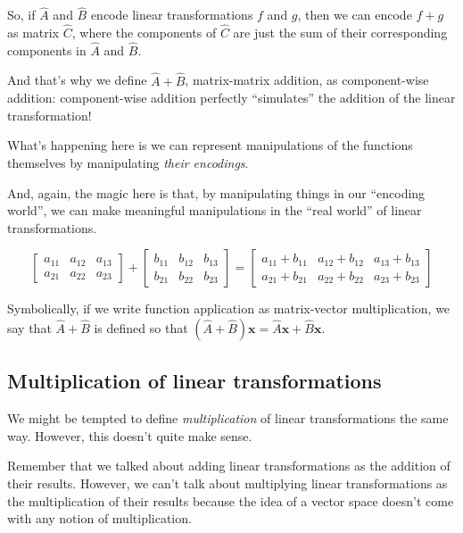\documentclass[]{article}
\begin{document}
So, if \(\hat{A}\) and \(\hat{B}\) encode linear transformations \(f\) and
\(g\), then we can encode \(f + g\) as matrix \(\hat{C}\), where the components
of \(\hat{C}\) are just the sum of their corresponding components in \(\hat{A}\)
and \(\hat{B}\).

And that's why we define \(\hat{A} + \hat{B}\), matrix-matrix addition, as
component-wise addition: component-wise addition perfectly ``simulates'' the
addition of the linear transformation!

What's happening here is we can represent manipulations of the functions
themselves by manipulating \emph{their encodings}.

And, again, the magic here is that, by manipulating things in our ``encoding
world'', we can make meaningful manipulations in the ``real world'' of linear
transformations.

\[
\begin{bmatrix}
a_{11} & a_{12} & a_{13} \\
a_{21} & a_{22} & a_{23}
\end{bmatrix}
+
\begin{bmatrix}
b_{11} & b_{12} & b_{13} \\
b_{21} & b_{22} & b_{23}
\end{bmatrix}
=
\begin{bmatrix}
a_{11}+b_{11} & a_{12}+b_{12} & a_{13}+b_{13} \\
a_{21}+b_{21} & a_{22}+b_{22} & a_{23}+b_{23}
\end{bmatrix}
\]

Symbolically, if we write function application as matrix-vector multiplication,
we say that \(\hat{A} + \hat{B}\) is defined so that
\((\hat{A} + \hat{B})\mathbf{x} = \hat{A} \mathbf{x} + \hat{B} \mathbf{x}\).

\subsection{Multiplication of linear
transformations}\label{multiplication-of-linear-transformations}

We might be tempted to define \emph{multiplication} of linear transformations
the same way. However, this doesn't quite make sense.

Remember that we talked about adding linear transformations as the addition of
their results. However, we can't talk about multiplying linear transformations
as the multiplication of their results because the idea of a vector space
doesn't come with any notion of multiplication.
\end{document}
